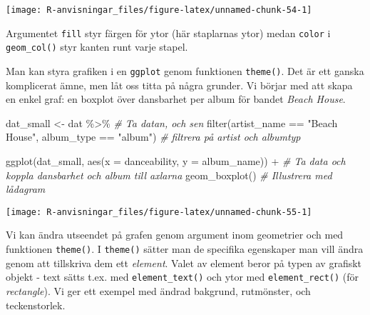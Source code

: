 \documentclass[
]{book}
\newenvironment{Shaded}{\begin{snugshade}}{\end{snugshade}}
\newcommand{\AttributeTok}[1]{\textcolor[rgb]{0.77,0.63,0.00}{#1}}
\newcommand{\CommentTok}[1]{\textcolor[rgb]{0.56,0.35,0.01}{\textit{#1}}}
\newcommand{\FunctionTok}[1]{\textcolor[rgb]{0.00,0.00,0.00}{#1}}
\newcommand{\NormalTok}[1]{#1}
\newcommand{\OtherTok}[1]{\textcolor[rgb]{0.56,0.35,0.01}{#1}}
\newcommand{\SpecialCharTok}[1]{\textcolor[rgb]{0.00,0.00,0.00}{#1}}
\newcommand{\StringTok}[1]{\textcolor[rgb]{0.31,0.60,0.02}{#1}}
\theoremstyle{definition}
\theoremstyle{definition}
\theoremstyle{definition}
\theoremstyle{definition}
\theoremstyle{remark}
\begin{document}
\begin{center}\texttt{[image: R-anvisningar\_files/figure-latex/unnamed-chunk-54-1]} \end{center}

Argumentet \texttt{fill} styr färgen för ytor (här staplarnas ytor) medan \texttt{color} i \texttt{geom\_col()} styr kanten runt varje stapel.

Man kan styra grafiken i en \texttt{ggplot} genom funktionen \texttt{theme()}. Det är ett ganska komplicerat ämne, men låt oss titta på några grunder. Vi börjar med att skapa en enkel graf: en boxplot över dansbarhet per album för bandet \emph{Beach House}.

\begin{Shaded}
\begin{Highlighting}[]
\NormalTok{dat\_small }\OtherTok{\textless{}{-}}\NormalTok{ dat }\SpecialCharTok{\%\textgreater{}\%}                                            \CommentTok{\# Ta datan, och sen}
  \FunctionTok{filter}\NormalTok{(artist\_name }\SpecialCharTok{==} \StringTok{"Beach House"}\NormalTok{, album\_type }\SpecialCharTok{==} \StringTok{"album"}\NormalTok{)   }\CommentTok{\# filtrera på artist och albumtyp}

\FunctionTok{ggplot}\NormalTok{(dat\_small, }\FunctionTok{aes}\NormalTok{(}\AttributeTok{x =}\NormalTok{ danceability, }\AttributeTok{y =}\NormalTok{ album\_name)) }\SpecialCharTok{+}      \CommentTok{\# Ta data och koppla dansbarhet och album till axlarna}
  \FunctionTok{geom\_boxplot}\NormalTok{()                                                }\CommentTok{\# Illustrera med lådagram}
\end{Highlighting}
\end{Shaded}

\begin{center}\texttt{[image: R-anvisningar\_files/figure-latex/unnamed-chunk-55-1]} \end{center}

Vi kan ändra utseendet på grafen genom argument inom geometrier och med funktionen \texttt{theme()}. I \texttt{theme()} sätter man de specifika egenskaper man vill ändra genom att tillskriva dem ett \emph{element}. Valet av element beror på typen av grafiskt objekt - text sätts t.ex. med \texttt{element\_text()} och ytor med \texttt{element\_rect()} (för \emph{rectangle}). Vi ger ett exempel med ändrad bakgrund, rutmönster, och teckenstorlek.
\end{document}
